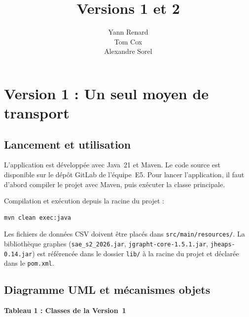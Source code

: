 \documentclass[fontsize=10pt,oneside,parskip=half]{scrreprt}
\title{Versions 1 et 2}
\author{Yann Renard \\ Tom Cox \\ Alexandre Sorel}
\newcommand{\ic}[1]{{\setlength{\fboxsep}{2pt}\colorbox{BeigeSerein}{\texttt{#1}}}}
\begin{document}

\maketitle
\pagecolor{Blanc}
{%
  \setlength{\parskip}{0pt}%
  \tableofcontents%
}

\chapter{Version 1 : Un seul moyen de transport}

\section{Lancement et utilisation}

L'application est développée avec Java~21 et Maven. Le code source est disponible
sur le dépôt GitLab de l'équipe~E5. Pour lancer l'application, il faut d'abord
compiler le projet avec Maven, puis exécuter la classe principale.

Compilation et exécution depuis la racine du projet :

\begin{lstlisting}[style=bash]
mvn clean exec:java
\end{lstlisting}

Les fichiers de données CSV doivent être placés dans \ic{src/main/resources/}.
La bibliothèque graphes (\ic{sae\_s2\_2026.jar}, \ic{jgrapht-core-1.5.1.jar},
\ic{jheaps-0.14.jar}) est référencée dans le dossier \ic{lib/} à la racine du
projet et déclarée dans le \ic{pom.xml}.

\section{Diagramme UML et mécanismes objets}

\noindent\textbf{Tableau 1 : Classes de la Version~1}
\end{document}
